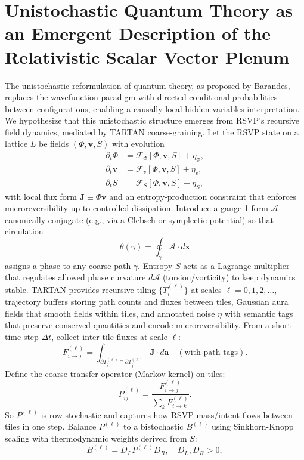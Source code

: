 \documentclass[11pt]{article}
\theoremstyle{plain}
\theoremstyle{definition}
\begin{document}
\section{Unistochastic Quantum Theory as an Emergent Description of the Relativistic Scalar Vector Plenum}
The unistochastic reformulation of quantum theory, as proposed by Barandes, replaces the wavefunction paradigm with directed conditional probabilities between configurations, enabling a causally local hidden-variables interpretation. We hypothesize that this unistochastic structure emerges from RSVP's recursive field dynamics, mediated by TARTAN coarse-graining.
Let the RSVP state on a lattice $L$ be fields $(\Phi,\bm{v},S)$ with evolution
\begin{align}
\partial_t \Phi &= \mathcal{F}_\Phi[\Phi,\bm{v},S] + \eta_\Phi, \label{eq:phi_evol}\\
\partial_t \bm{v} &= \mathcal{F}_v[\Phi,\bm{v},S] + \eta_v, \label{eq:v_evol}\\
\partial_t S &= \mathcal{F}_S[\Phi,\bm{v},S] + \eta_S, \label{eq:s_evol}
\end{align}
with local flux form $\bm{J} \equiv \Phi \bm{v}$ and an entropy-production constraint that enforces microreversibility up to controlled dissipation. Introduce a gauge 1-form $\mathcal{A}$ canonically conjugate (e.g., via a Clebsch or symplectic potential) so that circulation
\[
\theta(\gamma) = \oint_\gamma \mathcal{A} \cdot d\bm{x}
\]
assigns a phase to any coarse path $\gamma$. Entropy $S$ acts as a Lagrange multiplier that regulates allowed phase curvature $d\mathcal{A}$ (torsion/vorticity) to keep dynamics stable.
TARTAN provides recursive tiling $\{T_i^{(\ell)}\}$ at scales $\ell = 0,1,2,\dots$, trajectory buffers storing path counts and fluxes between tiles, Gaussian aura fields that smooth fields within tiles, and annotated noise $\eta$ with semantic tags that preserve conserved quantities and encode microreversibility.
From a short time step $\Delta t$, collect inter-tile fluxes at scale $\ell$:
\[
F_{i\to j}^{(\ell)} = \int_{\partial T_i^{(\ell)} \cap \partial T_j^{(\ell)}} \bm{J} \cdot d\bm{a} \quad (\text{with path tags}).
\]
Define the coarse transfer operator (Markov kernel) on tiles:
\[
P_{ij}^{(\ell)} = \frac{F_{i\to j}^{(\ell)}}{\sum_k F_{i\to k}^{(\ell)}}.
\]
So $P^{(\ell)}$ is row-stochastic and captures how RSVP mass/intent flows between tiles in one step.
Balance $P^{(\ell)}$ to a bistochastic $B^{(\ell)}$ using Sinkhorn-Knopp scaling with thermodynamic weights derived from $S$:
\[
B^{(\ell)} = D_L P^{(\ell)} D_R, \quad D_L, D_R > 0,
\]
\end{document}
